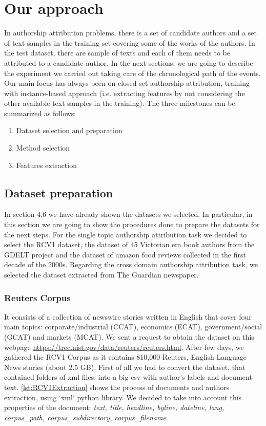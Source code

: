 \chapter{Our approach}
In authorship attribution problems, there is a set of candidate authors and a set of
text samples in the training set covering some of the works of the authors. In the
test dataset, there are sample of texts and each of them needs to be attributed to
a candidate author.
In the next sections, we are going to describe the experiment we carried out taking care of the chronological path of the events.
Our main focus has always been on closed set authorship attribution, training with instance-based approach (i.e. extracting features by not considering the other available text samples in the training).
The three milestones can be summarized as follows:
\begin{enumerate}
	\item Dataset selection and preparation
	\item Method selection
	\item Features extraction
\end{enumerate}

\section{Dataset preparation}
In section 4.6 we have already shown the datasets we selected. In particular, in this section we are going to show the procedures done to prepare the datasets for the next steps. For the single topic authorship attribution task we decided to select the RCV1 dataset, the dataset of 45 Victorian era book authors from the GDELT project and the dataset of amazon food reviews collected in the first decade of the 2000s. Regarding the cross domain authorship attribution task, we selected the dataset extracted from The Guardian newspaper.

\subsection{Reuters Corpus}
It consists of a collection of newswire stories written in English that cover four main topics: corporate/industrial (CCAT), economics (ECAT), government/social (GCAT) and markets (MCAT).
We sent a request to obtain the dataset on this webpage \url{https://trec.nist.gov/data/reuters/reuters.html}.
After few days, we gathered the RCV1 Corpus as it contains 810,000 Reuters, English Language News stories (about 2.5 GB).
First of all we had to convert the dataset, that contained folders of xml files, into a big csv with author's labels and document text.
\autoref{lst:RCV1Extraction} shows the process of documents and authors extraction, using `xml` python library. We decided to take into account this properties of the document: \textit{text, title, headline, byline, dateline, lang, corpus\_path, corpus\_subdirectory, corpus\_filename}.


